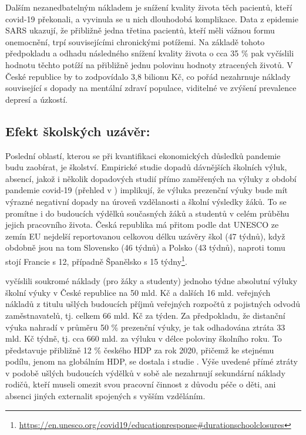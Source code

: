 Dalším nezanedbatelným nákladem je snížení kvality života těch pacientů, kteří covid-19 překonali, a vyvinula se u nich dlouhodobá komplikace. Data z epidemie SARS ukazují, že přibližně jedna třetina pacientů, kteří měli vážnou formu onemocnění, trpí souvisejícími chronickými potížemi. Na základě tohoto předpokladu a odhadu následného snížení kvality života o cca 35 \% pak \cite{Cutler2020} vyčíslili hodnotu těchto potíží na přibližně jednu polovinu hodnoty ztracených životů. V České republice by to zodpovídalo 3,8 bilionu Kč, co pořád nezahrnuje náklady související s dopady na mentální zdraví populace, viditelné ve zvýšení prevalence depresí a úzkostí.

\subsection*{Efekt školských uzávěr:} 

Poslední oblastí, kterou se při kvantifikaci ekonomických důsledků pandemie budu zaobírat, je školství. Empirické studie dopadů dávnějších školních výluk, absencí, jakož i několik dopadových studií přímo zaměřených na výluky z období pandemie covid-19 (přehled v \cite{Jann2021}) implikují, že výluka prezenční výuky bude mít výrazné negativní dopady na úroveň vzdělanosti a školní výsledky žáků. To se promítne i do budoucích výdělků současných žáků a studentů v celém průběhu jejich pracovního života. Česká republika má přitom podle dat UNESCO ze zemín EU nejdelší reportovanou celkovou délku uzávěry škol (47 týdnů), když obdobně jsou na tom Slovensko (46 týdnů) a Polsko (43 týdnů), naproti tomu stojí Francie s 12, případně Španělsko s 15 týdny\footnote{\url{https://en.unesco.org/covid19/educationresponse\#durationschoolclosures}}.

\cite{Jann2021} vyčíslili soukromé náklady (pro žáky a studenty) jednoho týdne absolutní výluky školní výuky v České republice na 50 mld. Kč a dalších 16 mld. veřejných nákladů z titulu ušlých budoucích příjmů veřejných rozpočtů z pojistných odvodů zaměstnavatelů, tj. celkem 66 mld. Kč za týden. Za předpokladu, že distanční výuka nahradí v průměru 50 \% prezenční výuky, je tak odhadována ztráta 33 mld. Kč týdně, tj. cca 660 mld. za výluku v délce poloviny školního roku. To představuje přibližně 12 \% českého HDP za rok 2020, přičemž ke stejnému podílu, jenom na globálním HDP, se dostala i studie \cite{Azevedo2020}. Výše uvedené přímé ztráty v podobě ušlých budoucích výdělků v sobě ale nezahrnují sekundární náklady rodičů, kteří museli omezit svou pracovní činnost z důvodu péče o děti, ani absenci jiných externalit spojených s vyšším vzděláním.


